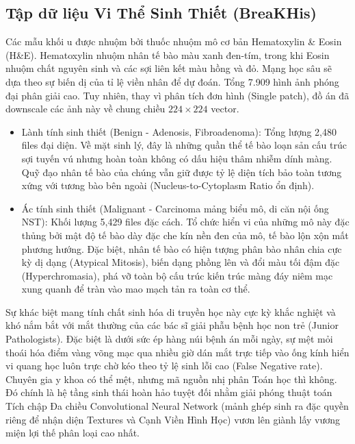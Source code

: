 \documentclass[conference,a4paper]{IEEEtran}
\begin{document}
\subsection{Tập dữ liệu Vi Thể Sinh Thiết (BreaKHis)}
Các mẫu khối u được nhuộm bởi thuốc nhuộm mô cơ bản Hematoxylin \& Eosin (H\&E). Hematoxylin nhuộm nhân tế bào màu xanh đen-tím, trong khi Eosin nhuộm chất nguyên sinh và các sợi liên kết màu hồng và đỏ. Mạng học sâu sẽ dựa theo sự biến dị của tỉ lệ viền nhân \cite{breakhis} để dự đoán.
Tổng 7.909 hình ảnh phóng đại phân giải cao. Tuy nhiên, thay vì phân tích đơn hình (Single patch), đồ án đã downscale các ảnh này về chung chiều $224 \times 224$ vector.
\begin{itemize}
\item Lành tính sinh thiết (Benign - Adenosis, Fibroadenoma): Tổng lượng 2,480 files đại diện. Về mặt sinh lý, đây là những quần thể tế bào loạn sản cấu trúc sợi tuyến vú nhưng hoàn toàn không có dấu hiệu thâm nhiễm dính màng. Quỹ đạo nhân tế bào của chúng vẫn giữ được tỷ lệ diện tích bảo toàn tương xứng với tương bào bên ngoài (Nucleus-to-Cytoplasm Ratio ổn định).
\item Ác tính sinh thiết (Malignant - Carcinoma mảng biểu mô, di căn nội ống NST): Khối lượng 5,429 files đặc cách. Tổ chức hiển vi của những mô này đặc thủng bởi mật độ tế bào dày đặc che kín nền đen của mô, tế bào lộn xộn mất phương hướng. Đặc biệt, nhân tế bào có hiện tượng phân bào nhân chia cực kỳ dị dạng (Atypical Mitosis), biến dạng phồng lên và đổi màu tối đậm đặc (Hyperchromasia), phá vỡ toàn bộ cấu trúc kiến trúc màng đáy niêm mạc xung quanh để tràn vào mao mạch tản ra toàn cơ thể.
\end{itemize}

Sự khác biệt mang tính chất sinh hóa di truyền học này cực kỳ khắc nghiệt và khó nắm bắt với mắt thường của các bác sĩ giải phẫu bệnh học non trẻ (Junior Pathologists). Đặc biệt là dưới sức ép hàng núi bệnh án mỗi ngày, sự mệt mỏi thoái hóa điểm vàng võng mạc qua nhiều giờ dán mắt trực tiếp vào ống kính hiển vi quang học luôn trực chờ kéo theo tỷ lệ sinh lỗi cao (False Negative rate). Chuyên gia y khoa có thể mệt, nhưng mã nguồn nhị phân Toán học thì không. Đó chính là hệ tầng sinh thái hoàn hảo tuyệt đối nhằm giải phóng thuật toán Tích chập Đa chiều Convolutional Neural Network (mảnh ghép sinh ra đặc quyền riêng để nhận diện Textures và Cạnh Viền Hình Học) vươn lên giành lấy vương miện lợi thế phân loại cao nhất.
\end{document}
